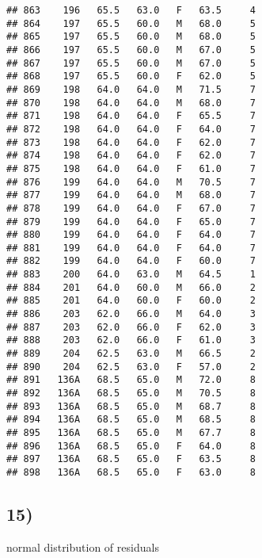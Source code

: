 \documentclass[
]{article}
\newenvironment{Shaded}{\begin{snugshade}}{\end{snugshade}}
\newcommand{\AttributeTok}[1]{\textcolor[rgb]{0.77,0.63,0.00}{#1}}
\newcommand{\FunctionTok}[1]{\textcolor[rgb]{0.00,0.00,0.00}{#1}}
\newcommand{\NormalTok}[1]{#1}
\newcommand{\OtherTok}[1]{\textcolor[rgb]{0.56,0.35,0.01}{#1}}
\newcommand{\SpecialCharTok}[1]{\textcolor[rgb]{0.00,0.00,0.00}{#1}}
\begin{document}
\begin{verbatim}
## 863    196   65.5   63.0   F   63.5     4
## 864    197   65.5   60.0   M   68.0     5
## 865    197   65.5   60.0   M   68.0     5
## 866    197   65.5   60.0   M   67.0     5
## 867    197   65.5   60.0   M   67.0     5
## 868    197   65.5   60.0   F   62.0     5
## 869    198   64.0   64.0   M   71.5     7
## 870    198   64.0   64.0   M   68.0     7
## 871    198   64.0   64.0   F   65.5     7
## 872    198   64.0   64.0   F   64.0     7
## 873    198   64.0   64.0   F   62.0     7
## 874    198   64.0   64.0   F   62.0     7
## 875    198   64.0   64.0   F   61.0     7
## 876    199   64.0   64.0   M   70.5     7
## 877    199   64.0   64.0   M   68.0     7
## 878    199   64.0   64.0   F   67.0     7
## 879    199   64.0   64.0   F   65.0     7
## 880    199   64.0   64.0   F   64.0     7
## 881    199   64.0   64.0   F   64.0     7
## 882    199   64.0   64.0   F   60.0     7
## 883    200   64.0   63.0   M   64.5     1
## 884    201   64.0   60.0   M   66.0     2
## 885    201   64.0   60.0   F   60.0     2
## 886    203   62.0   66.0   M   64.0     3
## 887    203   62.0   66.0   F   62.0     3
## 888    203   62.0   66.0   F   61.0     3
## 889    204   62.5   63.0   M   66.5     2
## 890    204   62.5   63.0   F   57.0     2
## 891   136A   68.5   65.0   M   72.0     8
## 892   136A   68.5   65.0   M   70.5     8
## 893   136A   68.5   65.0   M   68.7     8
## 894   136A   68.5   65.0   M   68.5     8
## 895   136A   68.5   65.0   M   67.7     8
## 896   136A   68.5   65.0   F   64.0     8
## 897   136A   68.5   65.0   F   63.5     8
## 898   136A   68.5   65.0   F   63.0     8
\end{verbatim}

\hypertarget{section-14}{%
\subsection{15)}\label{section-14}}

normal distribution of residuals

\begin{Shaded}
\end{Shaded}
\end{document}

